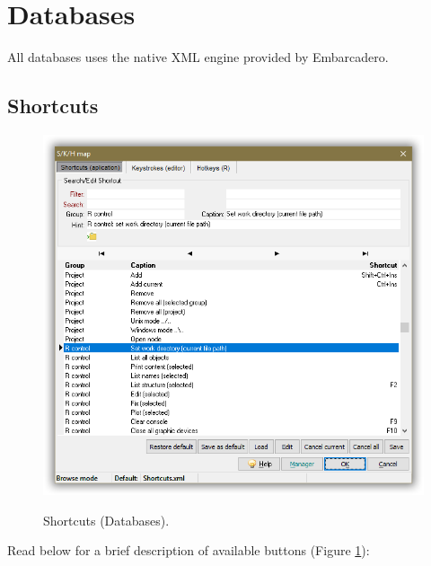 
\hypertarget{working_databases}{}
\section{Databases}

All databases uses the native XML engine provided by Embarcadero.

\subsection{Shortcuts}

\begin{figure}[H]
  \includegraphics[scale=0.35]{./res/shortcuts_dlg.png}\\
  \caption{Shortcuts (Databases).}
  \label{fig:shortcuts_dlg_2}
\end{figure}

Read below for a brief description of available buttons (Figure \ref{fig:shortcuts_dlg_2}):


